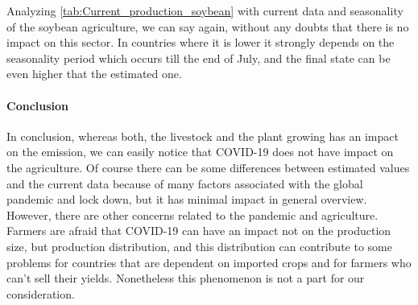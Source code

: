 Analyzing \autoref{tab:Current_production_soybean} with current data and seasonality of the soybean agriculture, we can say again, without any doubts that there is no impact on this sector. In countries where it is lower it strongly depends on the seasonality period which occurs till the end of July, and the final state can be even higher that the estimated one. 

\paragraph{Conclusion}

In conclusion, whereas both, the livestock and the plant growing has an impact on the \co emission, we can easily notice that COVID-19 does not have impact on the agriculture. Of course there can be some differences between estimated values and the current data because of many factors associated with the global pandemic and lock down, but it has minimal impact in general overview. 
However, there are other concerns related to the pandemic and agriculture. Farmers are afraid that COVID-19 can have an impact not on the production size, but production distribution, and this distribution can contribute to some problems for countries that are dependent on imported crops and for farmers who can't sell their yields. Nonetheless this phenomenon is not a part for our consideration. 